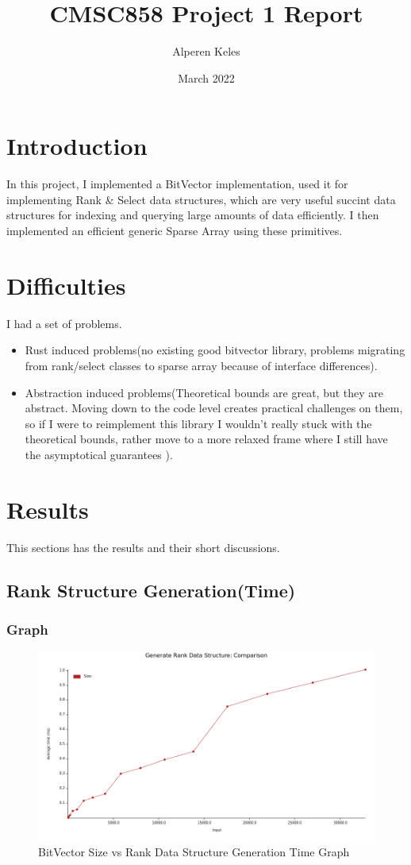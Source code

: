\documentclass{report}
\title{CMSC858 Project 1 Report}
\author{Alperen Keles }
\date{March 2022}
\begin{document}
\maketitle

\section*{Introduction}
In this project, I implemented a BitVector implementation, used it for implementing Rank \& Select data structures, which are very useful succint data structures for indexing and querying large amounts of data efficiently. I then implemented an efficient generic Sparse Array using these primitives. 
\section*{Difficulties}
I had a set of problems.
\begin{itemize}
    \item Rust induced problems(no existing good bitvector library, problems migrating from rank/select classes to sparse array because of interface differences).
    \item Abstraction induced problems(Theoretical bounds are great, but they are abstract. Moving down to the code level creates practical challenges on them, so if I were to reimplement this library I wouldn't really stuck with the theoretical bounds, rather move to a more relaxed frame where I still have the asymptotical guarantees ).
\end{itemize}
\section*{Results}
This sections has the results and their short discussions.
\newpage

\subsection*{Rank Structure Generation(Time)}
\subsubsection*{Graph}

\begin{figure}[h!]
    \centering
    \includegraphics[scale=0.5]{generate_rank_time.png}
    \caption{BitVector Size vs Rank Data Structure Generation Time Graph}
    \label{fig:my_label}
\end{figure}
\end{document}
